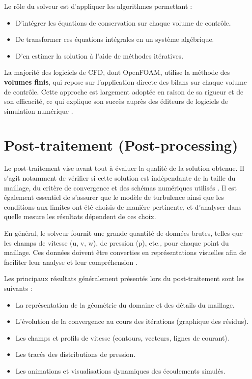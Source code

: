 Le rôle du solveur est d'appliquer les algorithmes permettant \cite{patankar1980numerical} :
\begin{itemize}
    \item D'intégrer les équations de conservation sur chaque volume de contrôle.
    \item De transformer ces équations intégrales en un système algébrique.
    \item D'en estimer la solution à l'aide de méthodes itératives.
\end{itemize}

La majorité des logiciels de CFD, dont OpenFOAM, utilise la méthode des \textbf{volumes finis}, qui repose sur l'application directe des bilans sur chaque volume de contrôle. Cette approche est largement adoptée en raison de sa rigueur et de son efficacité, ce qui explique son succès auprès des éditeurs de logiciels de simulation numérique \cite{versteeg2007introduction}.

\section{Post-traitement (Post-processing)}
\label{sec:postprocessing}

Le post-traitement vise avant tout à évaluer la qualité de la solution obtenue. Il s'agit notamment de vérifier si cette solution est indépendante de la taille du maillage, du critère de convergence et des schémas numériques utilisés \cite{roache1998verification}. Il est également essentiel de s'assurer que le modèle de turbulence ainsi que les conditions aux limites ont été choisis de manière pertinente, et d'analyser dans quelle mesure les résultats dépendent de ces choix.

En général, le solveur fournit une grande quantité de données brutes, telles que les champs de vitesse (u, v, w), de pression (p), etc., pour chaque point du maillage. Ces données doivent être converties en représentations visuelles afin de faciliter leur analyse et leur compréhension \cite{schroeder2006visualization}.

Les principaux résultats généralement présentés lors du post-traitement sont les suivants \cite{hansen2011visualization} :
\begin{itemize}
    \item La représentation de la géométrie du domaine et des détails du maillage.
    \item L'évolution de la convergence au cours des itérations (graphique des résidus).
    \item Les champs et profils de vitesse (contours, vecteurs, lignes de courant).
    \item Les tracés des distributions de pression.
    \item Les animations et visualisations dynamiques des écoulements simulés.
\end{itemize}

